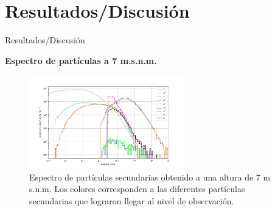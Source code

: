     \section{Resultados/Discusión}
    \begin{frame}{Resultados/Discusión} %
        \justifying %
        \vspace*{-0.3cm} %
        
        \begin{tcolorbox}[colback=custombgcolor3, coltext=customfgcolor2,
                      colframe=custombgcolor3, %
                      width=\textwidth,       %
                      boxrule=1pt,            %
                      top=1mm, bottom=1mm,     %
                      sharp corners=all,     %
                      halign=center,         %
                      valign=center,         %
                      ]
            \textbf{Espectro de partículas a 7 m.s.n.m.}        
        \end{tcolorbox}
        
        \begin{figure}
            \centering
            \includegraphics[width=0.6\textwidth]{Figures/Thesis_flux_new2_7msnm_without_title.png}
            \caption{\tiny Espectro de partículas secundarias obtenido a una altura de 7 m s.n.m.  Los colores corresponden a las diferentes partículas secundarias que lograron llegar al nivel de observación.}
        \end{figure}
    \end{frame}     
    

